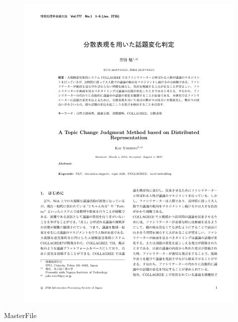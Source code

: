 \begin{figure}
	\centering
	\includegraphics[width=\linewidth,page=2]{../C.IPSJ80/jsample-submit.pdf}
\end{figure}
\clearpage
\expandafter\ifx\csname MasterFile\endcsname\relax

\fi
